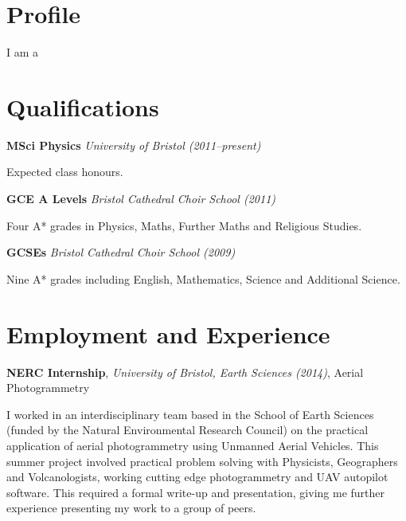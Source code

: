 \documentclass[11pt,a4paper,sans]{moderncv}
\begin{document}
\vspace*{-2.5\baselineskip}
\makecvtitle

\vspace*{-2\baselineskip}

\section{Profile}

I am a 

\vspace{5pt}

\section{Qualifications}

{\large\textbf{MSci Physics} \textit{University of Bristol (2011--present)} }

Expected  class honours.

\vspace{1em}
{\large\textbf{GCE A Levels} \textit{Bristol Cathedral Choir School (2011)} }

Four A* grades in Physics, Maths, Further Maths and Religious Studies.

\vspace{1em}
{\large\textbf{GCSEs} \textit{Bristol Cathedral Choir School (2009)} }

Nine A* grades including English, Mathematics, Science and Additional Science.

\vspace{5pt}

\section{Employment and Experience}

\vspace{2pt}

{\large\textbf{NERC Internship}, \textit{University of Bristol, Earth Sciences
(2014)}, Aerial Photogrammetry}

I worked in an interdisciplinary team based in the School of Earth Sciences
(funded by the Natural Environmental Research Council) on the practical
application of aerial photogrammetry using Unmanned Aerial Vehicles. This summer
project involved practical problem solving with Physicists, Geographers and
Volcanologists, working cutting edge photogrammetry and UAV autopilot software.
This required a formal write-up and presentation, giving me further experience
presenting my work to a group of peers.
\end{document}
